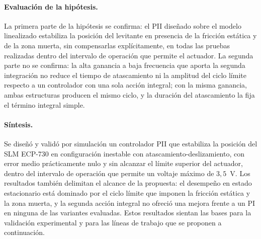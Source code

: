 \paragraph{Evaluación de la hipótesis.}
La primera parte de la hipótesis se confirma: el PII diseñado sobre el modelo linealizado estabiliza la posición del levitante en presencia de la fricción estática y de la zona muerta, sin compensarlas explícitamente, en todas las pruebas realizadas dentro del intervalo de operación que permite el actuador. La segunda parte no se confirma: la alta ganancia a baja frecuencia que aporta la segunda integración no reduce el tiempo de atascamiento ni la amplitud del ciclo límite respecto a un controlador con una sola acción integral; con la misma ganancia, ambas estructuras producen el mismo ciclo, y la duración del atascamiento la fija el término integral simple.

\paragraph{Síntesis.}
Se diseñó y validó por simulación un controlador PII que estabiliza la posición del SLM ECP-730 en configuración inestable con atascamiento-deslizamiento, con error medio prácticamente nulo y sin alcanzar el límite superior del actuador, dentro del intervalo de operación que permite un voltaje máximo de $3{,}5$~V. Los resultados también delimitan el alcance de la propuesta: el desempeño en estado estacionario está dominado por el ciclo límite que imponen la fricción estática y la zona muerta, y la segunda acción integral no ofreció una mejora frente a un PI en ninguna de las variantes evaluadas. Estos resultados sientan las bases para la validación experimental y para las líneas de trabajo que se proponen a continuación.
